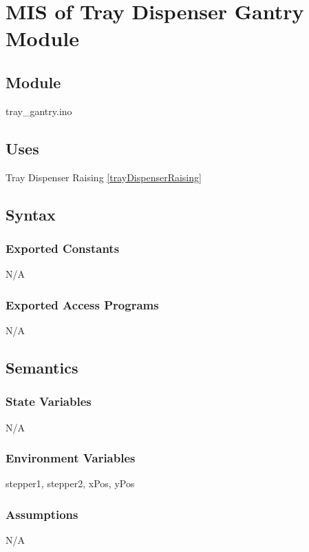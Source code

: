 \documentclass[12pt, titlepage]{article}
\begin{document}
  \section{MIS of Tray Dispenser Gantry Module} \label{trayDispenserGantry} 

\subsection{Module}

tray\_gantry.ino

\subsection{Uses}
Tray Dispenser Raising \ref{trayDispenserRaising}

\subsection{Syntax}

\subsubsection{Exported Constants}
N/A
\subsubsection{Exported Access Programs}

N/A

\subsection{Semantics}

\subsubsection{State Variables}

N/A


\subsubsection{Environment Variables}

stepper1, stepper2, xPos, yPos

\subsubsection{Assumptions}

N/A
\end{document}
